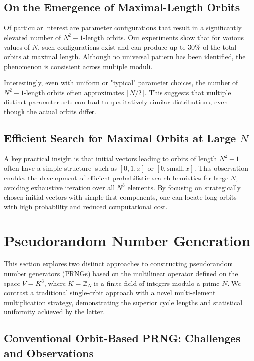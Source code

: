 \documentclass[12pt]{article}
\theoremstyle{definition}
\theoremstyle{plain}
\theoremstyle{remark}
\begin{document}
\subsection{On the Emergence of Maximal-Length Orbits}

Of particular interest are parameter configurations that result in a significantly elevated number of \( N^2 - 1 \)-length orbits. Our experiments show that for various values of \( N \), such configurations exist and can produce up to 30\% of the total orbits at maximal length. Although no universal pattern has been identified, the phenomenon is consistent across multiple moduli.

Interestingly, even with uniform or "typical" parameter choices, the number of \( N^2 - 1 \)-length orbits often approximates \( \lfloor N/2 \rfloor \). This suggests that multiple distinct parameter sets can lead to qualitatively similar distributions, even though the actual orbits differ.

\subsection{Efficient Search for Maximal Orbits at Large \texorpdfstring{$N$}{N}}

A key practical insight is that initial vectors leading to orbits of length \( N^2 - 1 \) often have a simple structure, such as \( [0, 1, x] \) or \( [0, \text{small}, x] \). This observation enables the development of efficient probabilistic search heuristics for large \( N \), avoiding exhaustive iteration over all \( N^3 \) elements. By focusing on strategically chosen initial vectors with simple first components, one can locate long orbits with high probability and reduced computational cost.

\section{Pseudorandom Number Generation}

This section explores two distinct approaches to constructing pseudorandom number generators (PRNGs) based on the multilinear operator defined on the space \( V = K^3 \), where \( K = \mathbb{Z}_N \) is a finite field of integers modulo a prime \( N \). We contrast a traditional single-orbit approach with a novel multi-element multiplication strategy, demonstrating the superior cycle lengths and statistical uniformity achieved by the latter.

\subsection{Conventional Orbit-Based PRNG: Challenges and Observations}
\end{document}
